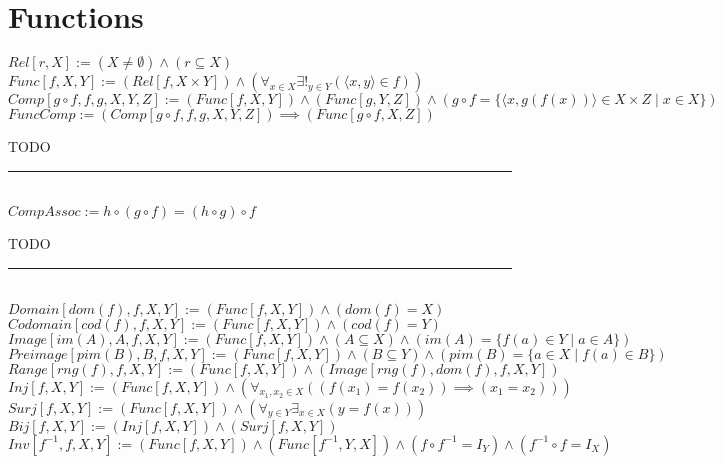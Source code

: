 \documentclass{book}
\newcommand{\abr}{:=}
\newcommand{\pr}[1]{\left(#1\right)}
\newcommand{\st}{\mathbin{|}}
\begin{document}
\section{Functions}
$Rel[r, X] \abr (X \neq \emptyset) \land (r \subseteq X)$ \\
$Func[f, X, Y] \abr (Rel[f, X \times Y]) \land \pr{\forall_{x \in X} \exists!_{y \in Y}(\langle x, y \rangle \in f)}$ \\
$Comp[g \circ f, f, g, X, Y, Z] \abr (Func[f, X, Y]) \land (Func[g, Y, Z]) \land \pr{g \circ f = \{\langle x, g\pr{f(x)} \rangle \in X \times Z \st x \in X\}}$ \\

$FuncComp \abr (Comp[g \circ f, f, g, X, Y, Z]) \implies (Func[g \circ f, X, Z])$
\begin{enumerate}
  \lit TODO
\end{enumerate} \vspace{.75mm} \hrule \vspace{.75mm} \ \\ 

$CompAssoc \abr h \circ (g \circ f) = (h \circ g) \circ f$
\begin{enumerate}
  \lit TODO
\end{enumerate} \vspace{.75mm} \hrule \vspace{.75mm} \ \\ 

$Domain[dom(f), f, X, Y] \abr (Func[f, X, Y]) \land \pr{dom(f) = X}$ \\
$Codomain[cod(f), f, X, Y] \abr (Func[f, X, Y]) \land \pr{cod(f) = Y}$ \\
$Image[im(A), A, f, X, Y] \abr (Func[f, X, Y]) \land (A \subseteq X) \land \pr{im(A) = \{f(a) \in Y \st a \in A\}}$ \\
$Preimage[pim(B), B, f, X, Y] \abr (Func[f, X, Y]) \land (B \subseteq Y) \land \pr{pim(B) = \{a \in X \st f(a) \in B\}}$ \\
$Range[rng(f), f, X, Y] \abr (Func[f, X, Y]) \land \pr{Image[rng(f), dom(f), f, X, Y]}$ \\

$Inj[f, X, Y] \abr (Func[f, X, Y]) \land \pr{\forall_{x_1, x_2 \in X}\pr{\pr{f(x_1) = f(x_2)} \implies (x_1 = x_2)}}$ \\ %
$Surj[f, X, Y] \abr (Func[f, X, Y]) \land \pr{\forall_{y \in Y} \exists_{x \in X}\pr{y = f(x)}}$ \\ %
$Bij[f, X, Y] \abr (Inj[f, X, Y]) \land (Surj[f, X, Y])$ \\ %
$Inv[f^{-1}, f, X, Y] \abr (Func[f, X, Y]) \land (Func[f^{-1}, Y, X]) \land (f \circ f^{-1} = I_Y) \land (f^{-1} \circ f = I_X)$ \\
\end{document}
